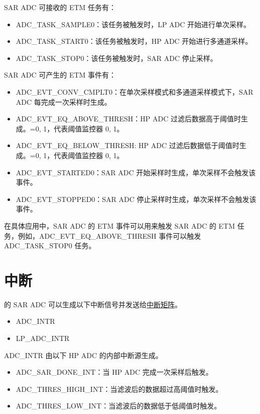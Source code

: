 \documentclass[main\_\_CN.tex]{subfiles}
\begin{document}
SAR ADC 可接收的 ETM 任务有：

\begin{itemize}
    \item ADC\_TASK\_SAMPLE0：该任务被触发时，LP ADC 开始进行单次采样。
    \item ADC\_TASK\_START0：该任务被触发时，HP ADC 开始进行多通道采样。
    \item ADC\_TASK\_STOP0：该任务被触发时，SAR ADC 停止采样。
\end{itemize}

SAR ADC 可产生的 ETM 事件有：

\begin{itemize}
    \item ADC\_EVT\_CONV\_CMPLT0：在单次采样模式和多通道采样模式下，SAR ADC 每完成一次采样时生成。
    \item ADC\_EVT\_EQ\_ABOVE\_THRESH：HP ADC 过滤后数据高于阈值时生成。=0, 1，代表阈值监控器 0, 1。
    \item ADC\_EVT\_EQ\_BELOW\_THRESH: HP ADC 过滤后数据低于阈值时生成。=0, 1，代表阈值监控器 0, 1。
    \item ADC\_EVT\_STARTED0：SAR ADC 开始采样时生成，单次采样不会触发该事件。
    \item ADC\_EVT\_STOPPED0：SAR ADC 停止采样时生成，单次采样不会触发该事件。
\end{itemize}

在具体应用中，SAR ADC 的 ETM 事件可以用来触发 SAR ADC 的 ETM 任务，例如，ADC\_EVT\_EQ\_ABOVE\_THRESH 事件可以触发 ADC\_TASK\_STOP0 任务。



\section{中断}


\chipname{} 的 SAR ADC 可以生成以下中断信号并发送给\hyperref[mod:intmtrx]{中断矩阵}。
   \begin{itemize}
        \item ADC\_INTR
        \item LP\_ADC\_INTR
    \end{itemize}

ADC\_INTR 由以下 HP ADC 的内部中断源生成。

\begin{itemize}
   \item \label{interreupt:ADCDONEINT1} ADC\_SAR\_DONE\_INT：当 HP ADC 完成一次采样后触发。
   \item \label{interreupt:ADCTHRESxHIGHINT} ADC\_THRES\_HIGH\_INT：当滤波后的数据超过高阈值时触发。
   \item \label{interreupt:ADCTHRESxLOWINT} ADC\_THRES\_LOW\_INT：当滤波后的数据低于低阈值时触发。
\end{itemize}
\end{document}
